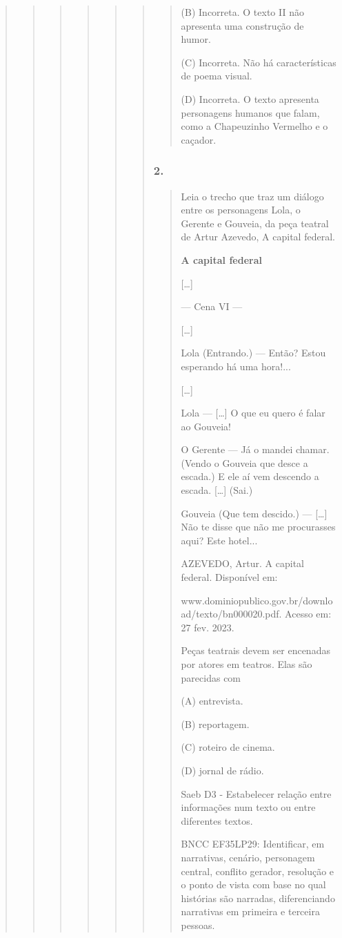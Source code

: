 \begin{quote}
\begin{quote}
\begin{quote}
\begin{quote}
\begin{quote}
\begin{quote}
\begin{quote}
(B) Incorreta. O texto II não apresenta uma construção de humor.

(C) Incorreta. Não há características de poema visual.

(D) Incorreta. O texto apresenta personagens humanos que falam, como a
Chapeuzinho Vermelho e o caçador.
\end{quote}

\subsubsection{2. }\label{section-85}

\begin{quote}
Leia o trecho que traz um diálogo entre os personagens Lola, o Gerente e
Gouveia, da peça teatral de Artur Azevedo, A capital federal.

\textbf{A capital federal}

{[}\ldots{}{]}

--- Cena VI ---

{[}\ldots{}{]}

Lola (Entrando.) --- Então? Estou esperando há uma hora!...

{[}\ldots{}{]}

Lola --- {[}\ldots{}{]} O que eu quero é falar ao Gouveia!

O Gerente --- Já o mandei chamar. (Vendo o Gouveia que desce a escada.)
E ele aí vem descendo a escada. {[}\ldots{}{]} (Sai.)

Gouveia (Que tem descido.) --- {[}\ldots{}{]} Não te disse que não me
procurasses aqui? Este hotel...

AZEVEDO, Artur. A capital federal. Disponível em:

www.dominiopublico.gov.br/download/texto/bn000020.pdf. Acesso em: 27
fev. 2023.

Peças teatrais devem ser encenadas por atores em teatros. Elas são
parecidas com

(A) entrevista.

(B) reportagem.

(C) roteiro de cinema.

(D) jornal de rádio.

Saeb D3 - Estabelecer relação entre informações num texto ou entre
diferentes textos.

BNCC EF35LP29: Identificar, em narrativas, cenário, personagem central,
conflito gerador, resolução e o ponto de vista com base no qual
histórias são narradas, diferenciando narrativas em primeira e terceira
pessoas.


\end{quote}
\end{quote}
\end{quote}
\end{quote}
\end{quote}
\end{quote}
\end{quote}
